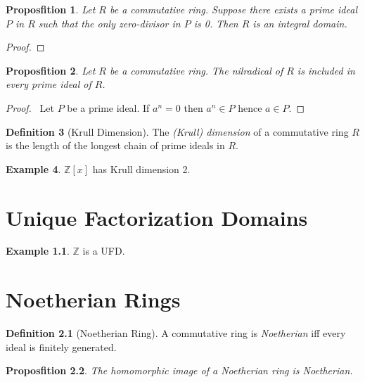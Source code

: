 \documentclass{book}
\let\qed\relax
\newtheorem{prop}{Proposfition}[chapter]
\theoremstyle{definition}
\newtheorem{df}[prop]{Definition}
\newtheorem{ex}[prop]{Example}
\begin{document}
\begin{prop}
Let $R$ be a commutative ring. Suppose there exists a prime ideal $P$ in $R$ such that the only zero-divisor in $P$ is 0. Then $R$ is an integral domain.
\end{prop}

\begin{proof}
\pf
{}
\qed
\end{proof}

\begin{prop}
Let $R$ be a commutative ring. The nilradical of $R$ is included in every prime ideal of $R$.
\end{prop}

\begin{proof}
\pf\ Let $P$ be a prime ideal. If $a^n = 0$ then $a^n \in P$ hence $a \in P$. \qed
\end{proof}


\begin{df}[Krull Dimension]
The \emph{(Krull) dimension} of a commutative ring $R$ is the length of the longest chain of prime ideals in $R$.
\end{df}

\begin{ex}
$\mathbb{Z}[x]$ has Krull dimension 2. %
\end{ex}

\chapter{Unique Factorization Domains}


\begin{ex}
$\mathbb{Z}$ is a UFD.
\end{ex}

\chapter{Noetherian Rings}

\begin{df}[Noetherian Ring]
A commutative ring is \emph{Noetherian} iff every ideal is finitely generated.
\end{df}

\begin{prop}
The homomorphic image of a Noetherian ring is Noetherian.
\end{prop}
\end{document}
